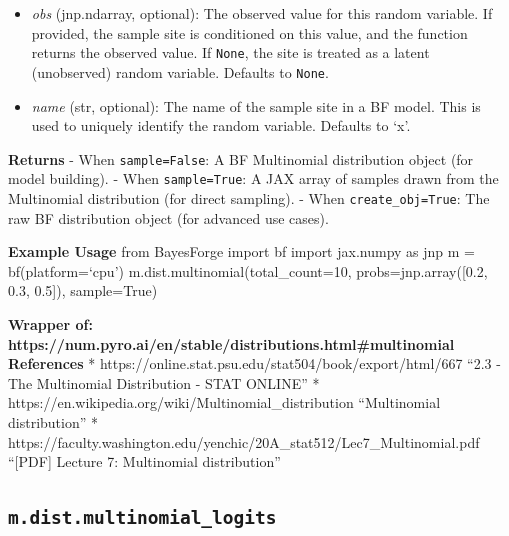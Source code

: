 \documentclass[
  letterpaper,
  DIV=11,
  numbers=noendperiod]{scrartcl}
\begin{document}
\begin{itemize}
  the session's random stream, set by \texttt{bf(rand\_seed=...)}, so
  consecutive draws differ but the whole sequence is reproducible. No
  effect when \texttt{sample=False}.
\item
  \emph{obs} (jnp.ndarray, optional): The observed value for this random
  variable. If provided, the sample site is conditioned on this value,
  and the function returns the observed value. If \texttt{None}, the
  site is treated as a latent (unobserved) random variable. Defaults to
  \texttt{None}.
\item
  \emph{name} (str, optional): The name of the sample site in a BF
  model. This is used to uniquely identify the random variable. Defaults
  to `x'.
\end{itemize}

\textbf{Returns} - When \texttt{sample=False}: A BF Multinomial
distribution object (for model building). - When \texttt{sample=True}: A
JAX array of samples drawn from the Multinomial distribution (for direct
sampling). - When \texttt{create\_obj=True}: The raw BF distribution
object (for advanced use cases).

\textbf{Example Usage} from BayesForge import bf import jax.numpy as jnp
m = bf(platform=`cpu') m.dist.multinomial(total\_count=10,
probs=jnp.array({[}0.2, 0.3, 0.5{]}), sample=True)

\textbf{Wrapper of:
https://num.pyro.ai/en/stable/distributions.html\#multinomial}
\textbf{References} *
https://online.stat.psu.edu/stat504/book/export/html/667 ``2.3 - The
Multinomial Distribution - STAT ONLINE'' *
https://en.wikipedia.org/wiki/Multinomial\_distribution ``Multinomial
distribution'' *
https://faculty.washington.edu/yenchic/20A\_stat512/Lec7\_Multinomial.pdf
``{[}PDF{]} Lecture 7: Multinomial distribution''

\subsection{\texorpdfstring{\texttt{m.dist.multinomial\_logits}}{m.dist.multinomial\_logits}}\label{multinomial_logits}
\end{document}
